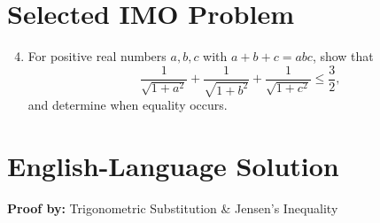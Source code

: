 \documentclass[12pt]{article}
\begin{document}
\section*{Selected IMO Problem}

\begin{enumerate}
    \setcounter{enumi}{3}
    \item For positive real numbers $a, b, c$ with $a + b + c = abc$, show that
    \[
        \frac{1}{\sqrt{1+a^2}} + \frac{1}{\sqrt{1+b^2}} + \frac{1}{\sqrt{1+c^2}} \le \frac{3}{2},
    \]
    and determine when equality occurs.
\end{enumerate}

\section*{English-Language Solution}
\textbf{Proof by:} Trigonometric Substitution \& Jensen's Inequality
\end{document}
